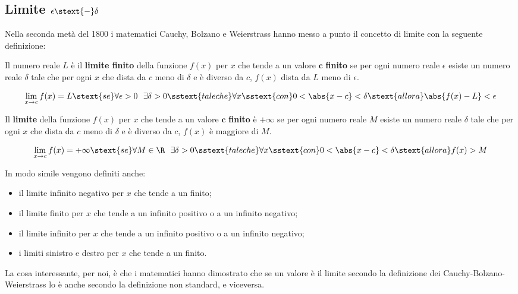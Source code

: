 \subsection{Limite \(\epsilon \stext{-} \delta\)}

Nella seconda metà del 1800 i matematici Cauchy, Bolzano e Weierstrass  
hanno messo a punto il concetto di limite con la seguente definizione:

\begin{definizione}
Il numero reale \(L\) è il \textbf{limite finito} della funzione \(f(x)\) 
per \(x\) che tende a un valore \(\mathbf{c}\) \textbf{finito} 
se per ogni numero reale \(\epsilon\) 
esiste un numero reale \(\delta\) tale che 
per ogni \(x\) che dista da \(c\) meno di \(\delta\) e 
è diverso da \(c\),
\(f(x)\) dista da \(L\) meno di \(\epsilon\).

\[\lim_{x \rightarrow c}f(x) = L \stext{se}
\forall \epsilon > 0 ~~ \exists \delta > 0 
\sstext{tale che} \forall x \sstext{con} 0 < \abs{x - c} < \delta
\stext{allora} 
\abs{f(x) - L} < \epsilon\]
\end{definizione}

\begin{definizione}
Il \textbf{limite} della funzione \(f(x)\) 
per \(x\) che tende a un valore \(\mathbf{c}\) \textbf{finito} 
è \(+\infty\)
se per ogni numero reale \(M\) 
esiste un numero reale \(\delta\) tale che 
per ogni \(x\) che dista da \(c\) meno di \(\delta\) e 
è diverso da \(c\),
\(f(x)\) è maggiore di \(M\).

\[\lim_{x \rightarrow c}f(x) = +\infty \stext{se}
\forall M \in \R ~~ \exists \delta > 0 
\sstext{tale che} \forall x \sstext{con} 0 < \abs{x - c} < \delta
\stext{allora} f(x) > M\]
\end{definizione}


In modo simile vengono definiti anche:
\begin{itemize} [noitemsep]
\item il limite infinito negativo per \(x\) che tende a un finito;
\item il limite finito per \(x\) che tende a un infinito positivo o 
a un infinito negativo;
\item il limite infinito per \(x\) che tende a un infinito positivo o 
a un infinito negativo;
\item i limiti sinistro e destro per \(x\) che tende a un finito.
\end{itemize}

La cosa interessante, per noi, è che i matematici hanno dimostrato che se un 
valore è il limite secondo la definizione dei Cauchy-Bolzano-Weierstrass 
lo è anche secondo la definizione non standard, e viceversa.
